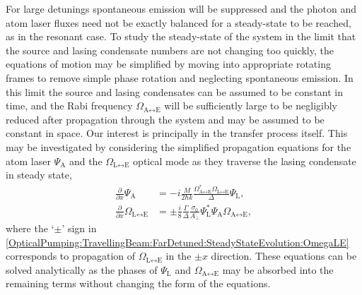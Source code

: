For large detunings spontaneous emission will be suppressed and the photon and atom laser fluxes need not be exactly balanced for a steady-state to be reached, as in the resonant case.  To study the steady-state of the system in the limit that the source and lasing condensate numbers are not changing too quickly, the equations of motion may be simplified by moving into appropriate rotating frames to remove simple phase rotation and neglecting spontaneous emission.  In this limit the source and lasing condensates can be assumed to be constant in time, and the Rabi frequency $\Omega_{\text{A} \leftrightarrow \text{E}}$ will be sufficiently large to be negligibly reduced after propagation through the system and may be assumed to be constant in space.  Our interest is principally in the transfer process itself.  This may be investigated by considering the simplified propagation equations for the atom laser $\Psi_\text{A}$ and the $\Omega_{\text{L} \leftrightarrow \text{E}}$ optical mode as they traverse the lasing condensate in steady state,
\begin{subequations}
    \label{OpticalPumping:TravellingBeam:FarDetuned:SteadyStateEvolution}
    \begin{align}
        \frac{\partial}{\partial x} \Psi_\text{A} &= -i \frac{M}{2 \hbar k} \frac{\Omega_{\text{A}\leftrightarrow\text{E}}^* \Omega_{\text{L} \leftrightarrow \text{E}}^{\phantom{*}}}{\Delta} \Psi_\text{L}, \label{OpticalPumping:TravellingBeam:FarDetuned:SteadyStateEvolution:PsiA}\\
        \frac{\partial}{\partial x} \Omega_{\text{L} \leftrightarrow \text{E}} &= \pm \frac{i}{8} \frac{\Gamma}{\Delta} \frac{\sigma_0}{A_\perp} \Psi_\text{L}^* \Psi_\text{A}^{\phantom{*}} \Omega_{\text{A} \leftrightarrow \text{E}}, \label{OpticalPumping:TravellingBeam:FarDetuned:SteadyStateEvolution:OmegaLE}
    \end{align}
\end{subequations}
where the `$\pm$' sign in \eqref{OpticalPumping:TravellingBeam:FarDetuned:SteadyStateEvolution:OmegaLE} corresponds to propagation of $\Omega_{\text{L} \leftrightarrow \text{E}}$ in the $\pm x$ direction.  These equations can be solved analytically as the phases of $\Psi_\text{L}$ and $\Omega_{\text{A} \leftrightarrow \text{E}}$ may be absorbed into the remaining terms without changing the form of the equations.

